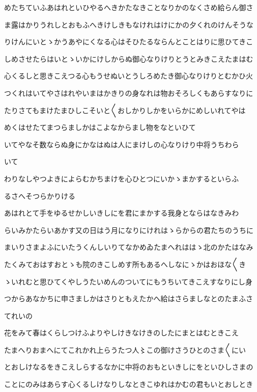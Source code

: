 \documentclass[a4paper,11pt,landscape]{ltjtarticle}
\begin{document}
\par\medskip
めたちていふあはれといひやるへきかたなきことなりかのなくさめ給らん御さ
\par\medskip
ま露はかりうれしとおもふへきけしきもなけれはけにかの夕くれのけんそうな
\par\medskip
りけんにいとゝかうあやにくなる心はそひたるならんとことはりに思ひてきこ
\par\medskip
しめさせたらはいとゝいかにけしからぬ御心なりけりとうとみきこえたまはむ
\par\medskip
心くるしと思きこえつる心もうせぬいとうしろめたき御心なりけりとむかひ火
\par\medskip
つくれはいてやさはれやいまはかきりの身なれは物おそろしくもあらすなりに
\par\medskip
たりさてもまけたまひしこそいと〱おしかりしかをいらかにめしいれてやは
\par\medskip
めくはせたてまつらましかはこよなからまし物をなといひて
\par\medskip
いてやなそ数ならぬ身にかなはぬは人にまけしの心なりけり中将うちわら
\par\medskip
いて
\par\medskip
わりなしやつよきによらむかちまけを心ひとつにいかゝまかするといらふ
\par\medskip
るさへそつらかりける
\par\medskip
あはれとて手をゆるせかしいきしにを君にまかする我身とならはなきみわ
\par\medskip
らいみかたらいあかす又の日はう月になりにけれはゝらからの君たちのうちに
\par\medskip
まいりさまよふにいたうくんしいりてなかめゐたまへれははゝ北のかたはなみ
\par\medskip
たくみておはすおとゝも院のきこしめす所もあるへしなにゝかはおほな〱き
\par\medskip
ゝいれむと思ひてくやしうたいめんのついてにもうちいてきこえすなりにし身
\par\medskip
つからあなかちに申さましかはさりともえたかへ給はさらましなとのたまふさ
\par\medskip
てれいの
\par\medskip
花をみて春はくらしつけふよりやしけきなけきのしたにまとはむときこえ
\par\medskip
たまへりおまへにてこれかれ上らうたつ人〻この御けさうひとのさま〱にい
\par\medskip
とおしけなるをきこえしらするなかに中将のおもといきしにをといひしさまの
\par\medskip
ことにのみはあらす心くるしけなりしなときこゆれはかむの君もいとおしとき
\end{document}

